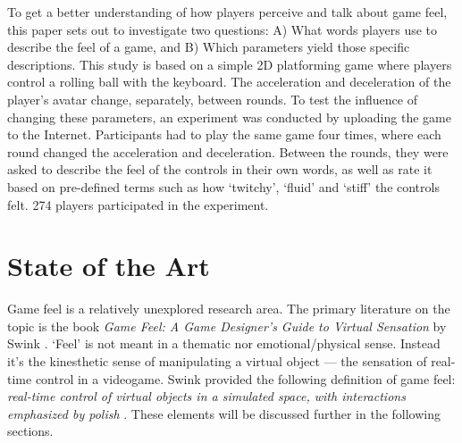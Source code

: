 To get a better understanding of how players perceive and talk about game feel, this paper sets out to investigate two questions: A) What words players use to describe the feel of a game, and B) Which parameters yield those specific descriptions. This study is based on a simple 2D platforming game where players control a rolling ball with the keyboard. The acceleration and deceleration of the player's avatar change, separately, between rounds. To test the influence of changing these parameters, an experiment was conducted by uploading the game to the Internet. Participants had to play the same game four times, where each round changed the acceleration and deceleration. Between the rounds, they were asked to describe the feel of the controls in their own words, as well as rate it based on pre-defined terms such as how `twitchy', `fluid' and `stiff' the controls felt. 274 players participated in the experiment.

\section{State of the Art} \label{stateOfTheArt}


Game feel is a relatively unexplored research area. The primary literature on the topic is the book \textit{Game Feel: A Game Designer's Guide to Virtual Sensation} by Swink \cite{swink}. `Feel' is not meant in a thematic nor emotional/physical sense. Instead it's the kinesthetic sense of manipulating a virtual object --- the sensation of real-time control in a videogame. Swink provided the following definition of game feel: \textit{real-time control of virtual objects in a simulated space, with interactions emphasized by polish} \cite{swink}. These elements will be discussed further in the following sections.

